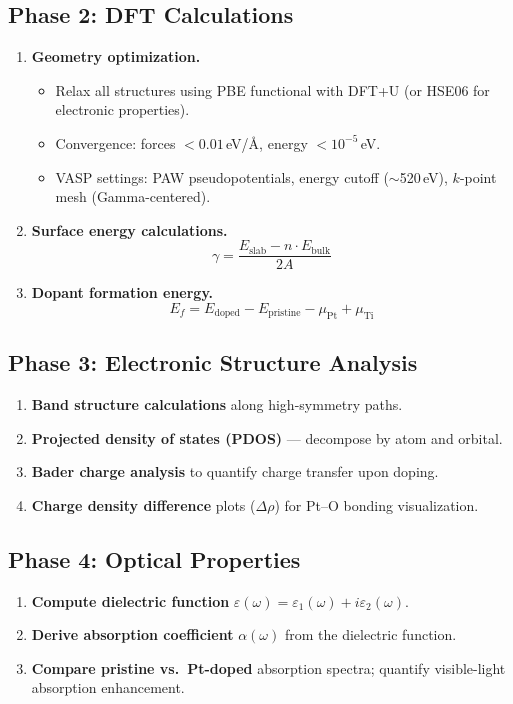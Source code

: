 \documentclass[11pt,a4paper]{article}
\begin{document}
\subsection{Phase 2: DFT Calculations}
\begin{enumerate}[label=\textbf{2.\arabic*}]
  \item \textbf{Geometry optimization.}
    \begin{itemize}
      \item Relax all structures using PBE functional with DFT+U (or HSE06 for electronic properties).
      \item Convergence: forces $< 0.01$\,eV/\AA, energy $< 10^{-5}$\,eV.
      \item VASP settings: PAW pseudopotentials, energy cutoff ($\sim$520\,eV), $k$-point mesh (Gamma-centered).
    \end{itemize}
  \item \textbf{Surface energy calculations.}
    \begin{equation*}
      \gamma = \frac{E_{\text{slab}} - n \cdot E_{\text{bulk}}}{2A}
    \end{equation*}
  \item \textbf{Dopant formation energy.}
    \begin{equation*}
      E_f = E_{\text{doped}} - E_{\text{pristine}} - \mu_{\text{Pt}} + \mu_{\text{Ti}}
    \end{equation*}
\end{enumerate}

\subsection{Phase 3: Electronic Structure Analysis}
\begin{enumerate}[label=\textbf{3.\arabic*}]
  \item \textbf{Band structure calculations} along high-symmetry paths.
  \item \textbf{Projected density of states (PDOS)} --- decompose by atom and orbital.
  \item \textbf{Bader charge analysis} to quantify charge transfer upon doping.
  \item \textbf{Charge density difference} plots ($\Delta \rho$) for Pt--O bonding visualization.
\end{enumerate}

\subsection{Phase 4: Optical Properties}
\begin{enumerate}[label=\textbf{4.\arabic*}]
  \item \textbf{Compute dielectric function} $\varepsilon(\omega) = \varepsilon_1(\omega) + i\varepsilon_2(\omega)$.
  \item \textbf{Derive absorption coefficient} $\alpha(\omega)$ from the dielectric function.
  \item \textbf{Compare pristine vs.\ Pt-doped} absorption spectra; quantify visible-light absorption enhancement.
\end{enumerate}
\end{document}
